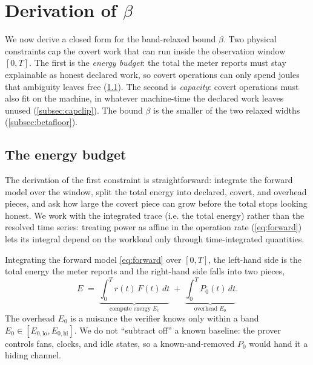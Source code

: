 \documentclass{article}
\theoremstyle{plain}
\theoremstyle{definition}
\theoremstyle{remark}
\begin{document}
\section{Derivation of \texorpdfstring{$\beta$}{beta}}
\label{sec:floor}

We now derive a closed form for the band-relaxed bound $\beta$. Two physical constraints cap the
covert work that can run inside the observation window $[0,T]$. The first is the
\emph{energy budget}: the total the meter reports must stay explainable as
honest declared work, so covert operations can only spend joules that
ambiguity leaves free (\cref{subsec:derivation}). The second is
\emph{capacity}: covert operations must also fit on the machine, in whatever
machine-time the declared work leaves unused (\cref{subsec:capclip}). The
bound $\beta$ is the smaller of the two relaxed widths (\cref{subsec:betafloor}).

\subsection{The energy budget}
\label{subsec:derivation}

The derivation of the first constraint is straightforward: integrate the forward
model over the window, split the total energy into declared, covert, and
overhead pieces, and ask how large the covert piece can grow before the total
stops looking honest. We work with the integrated trace (i.e. the total
energy) rather than the resolved time series: treating power as affine in the
operation rate (\cref{eq:forward}) lets its integral depend on the workload
only through time-integrated quantities.

Integrating the forward model \cref{eq:forward} over $[0,T]$, the left-hand
side is the total energy the meter reports and the right-hand side falls
into two pieces,
\begin{equation}
	E \;=\; \underbrace{\int_0^T r(t)\,F(t)\,dt}_{\text{compute energy } E_c}
	\;+\; \underbrace{\int_0^T P_0(t)\,dt}_{\text{overhead } E_0}.
	\label{eq:integrated}
\end{equation}
The overhead $E_0$ is a nuisance the verifier knows only within a band
$E_0 \in [E_{0,\mathrm{lo}}, E_{0,\mathrm{hi}}]$. We do not ``subtract
off'' a known baseline: the prover controls fans, clocks, and idle states,
so a known-and-removed $P_0$ would hand it a hiding channel.
\end{document}

